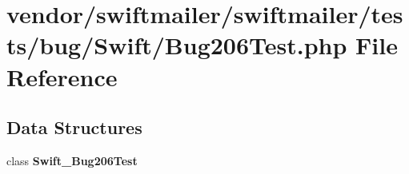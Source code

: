 \section{vendor/swiftmailer/swiftmailer/tests/bug/\+Swift/\+Bug206\+Test.php File Reference}
\label{_bug206_test_8php}
\subsection*{Data Structures}
\begin{DoxyCompactItemize}
\item 
class {\bf Swift\+\_\+\+Bug206\+Test}
\end{DoxyCompactItemize}
